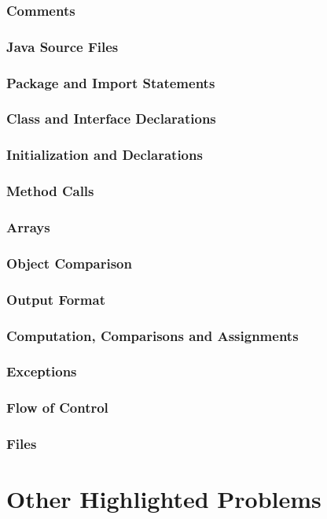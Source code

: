 \documentclass{article}
\begin{document}
\subsubsection{Comments}
\subsubsection{Java Source Files}
\subsubsection{Package and Import Statements}
\subsubsection{Class and Interface Declarations}
\subsubsection{Initialization and Declarations}
\subsubsection{Method Calls}
\subsubsection{Arrays}
\subsubsection{Object Comparison}
\subsubsection{Output Format}
\subsubsection{Computation, Comparisons and Assignments}
\subsubsection{Exceptions}
\subsubsection{Flow of Control}
\subsubsection{Files}

\section{Other Highlighted Problems}
\end{document}
